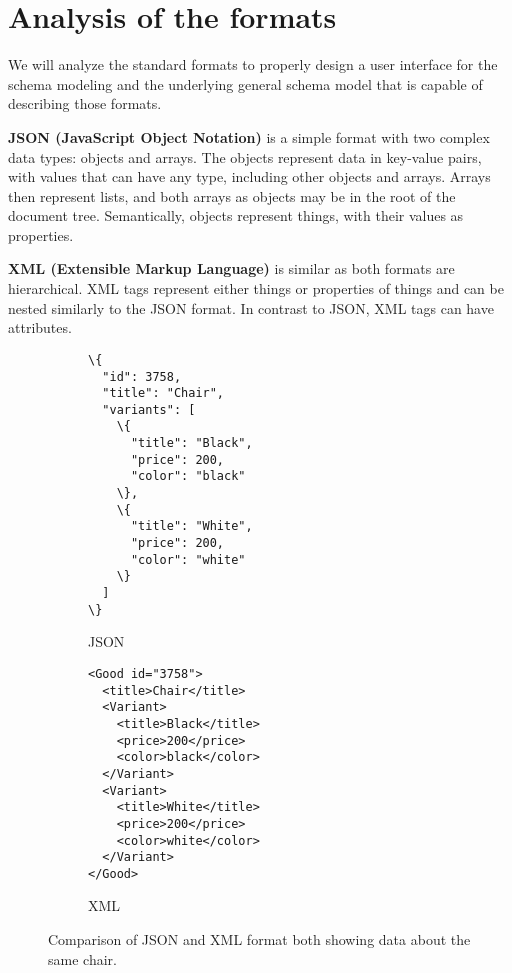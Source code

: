 \section*{Analysis of the formats}


We will analyze the standard formats to properly design a user interface for the schema modeling and the underlying general schema model that is capable of describing those formats.

\textbf{JSON (JavaScript Object Notation)} is a simple format with two complex data types: objects and arrays. The objects represent data in key-value pairs, with values that can have any type, including other objects and arrays. Arrays then represent lists, and both arrays as objects may be in the root of the document tree. Semantically, objects represent things, with their values as properties.

\textbf{XML (Extensible Markup Language)} is similar as both formats are hierarchical. XML tags represent either things or properties of things and can be nested similarly to the JSON format. In contrast to JSON, XML tags can have attributes.

\begin{figure}[h!]\centering
    \begin{subfigure}[b]{.5\textwidth}
\begin{Verbatim}[commandchars=\\\{\}]
\{
  "id": 3758,
  "title": "Chair",
  "variants": [
    \{
      "title": "Black",
      "price": 200,
      "color": "black"
    \},
    \{
      "title": "White",
      "price": 200,
      "color": "white"
    \}
  ]
\}
\end{Verbatim}
        \caption{JSON}
      \end{subfigure}%
      \begin{subfigure}[b]{.5\textwidth}
\begin{Verbatim}[commandchars=\\\{\}]
<Good id="3758">
  <title>Chair</title>
  <Variant>
    <title>Black</title>
    <price>200</price>
    <color>black</color>
  </Variant>
  <Variant>
    <title>White</title>
    <price>200</price>
    <color>white</color>
  </Variant>
</Good>
\end{Verbatim}

\vfill

        \caption{XML}
      \end{subfigure}
    \caption{Comparison of JSON and XML format both showing data about the same chair.}
    \label{analysis/xml-json}
\end{figure}

